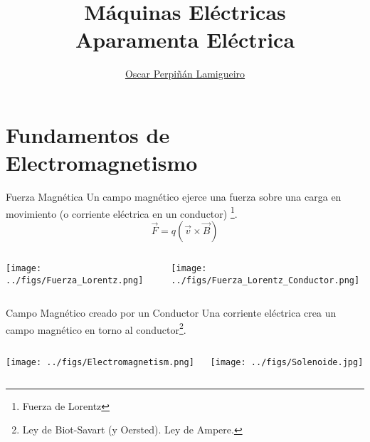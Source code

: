 \documentclass[xcolor={usenames,svgnames,dvipsnames}]{beamer}
\author{\href{https://oscarperpinan.github.io}{Oscar Perpiñán Lamigueiro}}
\date{}
\title{Máquinas Eléctricas \\ Aparamenta Eléctrica}
\institute[UPM]{Universidad Politécnica de Madrid}
\begin{document}
\maketitle

\section{Fundamentos de Electromagnetismo}
\label{sec:org983de41}

\begin{frame}[label={sec:org5d0edf5}]{Fuerza Magnética}
Un campo magnético ejerce una fuerza sobre una carga en movimiento (o corriente eléctrica en un conductor) \footnote{Fuerza de Lorentz}.
\[
\vec{F} = q (\vec{v} \times \vec{B})
\]

\begin{columns}
\begin{column}{0.5\columnwidth}
\begin{center}
\texttt{[image: ../figs/Fuerza\_Lorentz.png]}
\end{center}
\end{column}

\begin{column}{0.5\columnwidth}
\begin{center}
\texttt{[image: ../figs/Fuerza\_Lorentz\_Conductor.png]}
\end{center}
\end{column}
\end{columns}
\end{frame}

\begin{frame}[label={sec:org69803f6}]{Campo Magnético creado por un Conductor}
Una corriente eléctrica crea un campo magnético en torno al conductor\footnote{Ley de Biot-Savart (y Oersted). Ley de Ampere.}. 

\begin{columns}
\begin{column}{0.5\columnwidth}
\begin{center}
\texttt{[image: ../figs/Electromagnetism.png]}
\end{center}
\end{column}
\begin{column}{0.5\columnwidth}
\begin{center}
\texttt{[image: ../figs/Solenoide.jpg]}
\end{center}
\end{column}
\end{columns}
\end{frame}
\end{document}
